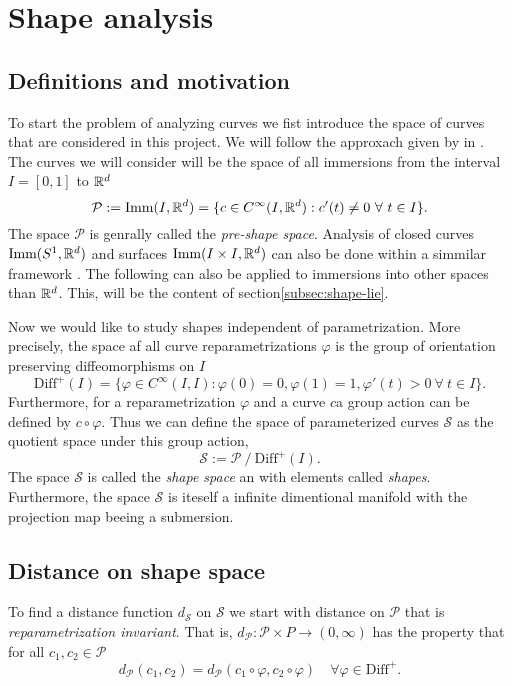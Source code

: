 
\section{Shape analysis}
\subsection{Definitions and motivation}
To start the problem of analyzing curves we fist introduce the space of curves that are considered in this project. We will follow the approxach given by \citeauthor[]{bauer2015why} in \cite{bauer2015why}. The curves we will consider will be the space of all immersions from the interval  \(I = [0, 1]\) to  \(\mathbb{R}^d\)
\begin{equation}
  \mathcal{P}:= \text{Imm}(I, \mathbb{R}^d) = \{c \in C^{\infty}(I, \mathbb{R}^d) :  c'(t) \neq  0 \ \forall \ t \in I  \}.
\end{equation}
The space \(\mathcal{P}\) is genrally called the \emph{pre-shape space}. Analysis of closed curves \(\text{Imm}(S^1, \mathbb{R}^d)\) and surfaces \(\text{Imm}(I \times I, \mathbb{R}^d)\) can also be done within a simmilar framework \cite{bauer2014overview}.
The following can also be applied to immersions into other spaces than \(\mathbb{R}^d\). This, will be the content of section\ref{subsec:shape-lie}. 

Now we would like to study shapes independent of parametrization. More precisely, the space af all curve reparametrizations   \(\varphi\) is the group of orientation preserving diffeomorphisms on  \(I\)
\begin{equation}
  \text{Diff}^+(I) = \{\varphi \in C^{\infty}(I,I): \varphi(0) = 0, \varphi(1) = 1, \varphi'(t) > 0 \ \forall \ t \in I \}.
\end{equation}
Furthermore, for a reparametrization  \(\varphi \) and a curve  \(c\)a group action can be defined by  \(c \circ \varphi\). Thus we can define the space of parameterized curves \(\mathcal{S}\) as the quotient space under this group action,
\begin{equation}
  \mathcal{S} := \mathcal{P} \ / \ {\text{Diff}^+(I)}.
\end{equation}
The space  \(\mathcal{S}\) is called the \emph{shape space} an with elements called \emph{shapes}. Furthermore, the space \(\mathcal{S}\) is iteself a infinite dimentional manifold with the projection map beeing a submersion. 

\subsection{Distance on shape space}
To find a distance function \(d_{\mathcal{S}}\) on \(\mathcal{S}\) we start with distance on \(\mathcal{\mathcal{P}}\) that is \emph{reparametrization invariant}. That is, \(d_\mathcal{P} : \mathcal{P} \times P \rightarrow (0, \infty)\) has the property that for all  \(c_1, c_2 \in \mathcal{P}\)
\begin{equation}
  d_{\mathcal{P}}(c_1, c_2)=d_{\mathcal{P}}(c_1 \circ \varphi, c_2\circ \varphi) \quad \forall \varphi \in \text{Diff}^+.
\end{equation}

